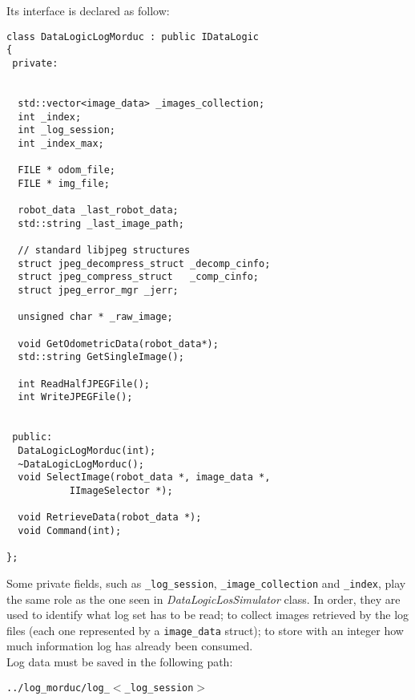 Its interface is declared as follow:
\\
\begin{lstlisting}[caption={\texttt{DataLogicLogMorduc} declaration},
    label={code:datalogiclogmorduc:interface}]
class DataLogicLogMorduc : public IDataLogic
{
 private:

  
  std::vector<image_data> _images_collection;
  int _index;
  int _log_session;
  int _index_max;

  FILE * odom_file;
  FILE * img_file;

  robot_data _last_robot_data;
  std::string _last_image_path;

  // standard libjpeg structures
  struct jpeg_decompress_struct _decomp_cinfo;
  struct jpeg_compress_struct   _comp_cinfo;
  struct jpeg_error_mgr _jerr;

  unsigned char * _raw_image;
 
  void GetOdometricData(robot_data*);
  std::string GetSingleImage();

  int ReadHalfJPEGFile();
  int WriteJPEGFile();

  
 public:
  DataLogicLogMorduc(int);
  ~DataLogicLogMorduc();
  void SelectImage(robot_data *, image_data *,
		   IImageSelector *);

  void RetrieveData(robot_data *);
  void Command(int);

};
\end{lstlisting}

Some private fields, such as
\texttt{\_log\_session}, \texttt{\_image\_collection}
and \texttt{\_index}, play
the same role as the one seen in \textit{DataLogicLosSimulator}
class. In order, they are used to identify what log set has
to be read; to collect images retrieved by the log files (each
one represented by a \texttt{image\_data} struct);
to store with an integer how much information log has already
been consumed.
\\
Log data must be saved in the following path:

\begin{center}
  \texttt{../log\_morduc/log\_$<$\_log\_session$>$}
\end{center}

